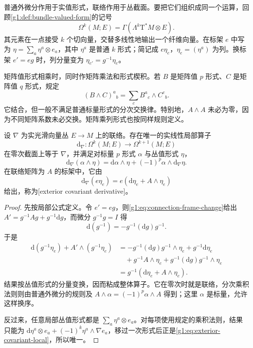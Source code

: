 普通外微分作用于实值形式，联络作用于丛截面。要把它们组织成同一个运算，回顾\cref{g1:def:bundle-valued-form}的记号
\[
	\Omega^k(M;E)=\Gamma(\Lambda^k\mathrm{T}^*M\otimes E).
\]
其元素在一点接受 \(k\) 个切向量，交替多线性地输出一个纤维向量。在标架 \(e\) 中写为 \(\eta=\sum_a\eta^a\otimes e_a\)，其中 \(\eta^a\) 是普通 \(k\) 形式；简记成 \(e\eta_e\)，\(\eta_e=(\eta^a)\) 为列。换标架 \(e'=eg\) 时，列分量变为 \(\eta_{e'}=g^{-1}\eta_e\)。

\ProseParagraphBreak

矩阵值形式相乘时，同时作矩阵乘法和形式楔积。若 \(B\) 是矩阵值 \(p\) 形式、\(C\) 是矩阵值 \(q\) 形式，规定
\[
	(B\wedge C)^a{}_b=\sum_c B^a{}_c\wedge C^c{}_b.
\]
它结合，但一般不满足普通标量形式的分次交换律。特别地，\(A\wedge A\) 未必为零，因为不同矩阵系数未必交换。矩阵乘列形式也按同样规则定义。

\begin{proposition}\label{g1:prop:exterior-covariant-derivative}
	设 \(\nabla\) 为实光滑向量丛 \(E\to M\) 上的联络。存在唯一的实线性局部算子
	\[
		\mathrm{d}_\nabla:\Omega^k(M;E)\longrightarrow\Omega^{k+1}(M;E)
	\]
	在零次截面上等于 \(\nabla\)，并满足对标量 \(p\) 形式 \(\alpha\) 与丛值形式 \(\eta\)，
	\[
		\mathrm{d}_\nabla(\alpha\wedge\eta)
		=\mathrm{d}\alpha\wedge\eta+(-1)^p\alpha\wedge\mathrm{d}_\nabla\eta.
	\]
	在联络矩阵为 \(A\) 的标架中，它由
	\begin{equation}\label{g1:eq:exterior-covariant-local}
		\mathrm{d}_\nabla(e\eta_e)=e(\mathrm{d}\eta_e+A\wedge\eta_e)
	\end{equation}
	给出，称为[exterior covariant derivative]。
\end{proposition}
\begin{proof}
	先按局部公式定义。令 \(e'=eg\)，则\eqref{g1:eq:connection-frame-change}给出 \(A'=g^{-1}Ag+g^{-1}\mathrm{d}g\)，而微分 \(g^{-1}g=I\) 得
	\[
		\mathrm{d}(g^{-1})=-g^{-1}(\mathrm{d}g)g^{-1}.
	\]
	于是
	\begin{align*}
		\mathrm{d}(g^{-1}\eta_e)+A'\wedge(g^{-1}\eta_e)
		&=-g^{-1}(\mathrm{d}g)g^{-1}\wedge\eta_e+g^{-1}\mathrm{d}\eta_e\\
		&\quad+g^{-1}A\wedge\eta_e+g^{-1}(\mathrm{d}g)g^{-1}\wedge\eta_e\\
		&=g^{-1}(\mathrm{d}\eta_e+A\wedge\eta_e).
	\end{align*}
	结果按丛值形式的分量变换，因而粘成整体算子。它在零次时就是联络，分次乘积法则则由普通外微分的规则及 \(A\wedge\alpha=(-1)^p\alpha\wedge A\) 得到；这里 \(\alpha\) 是标量，允许这样换序。

	反过来，任意局部丛值形式都是 \(\sum_a\eta^a\otimes e_a\)。对每项使用规定的乘积法则，结果只能为 \(\mathrm{d}\eta^a\otimes e_a+(-1)^k\eta^a\wedge\nabla e_a\)，移过一次形式后正是\eqref{g1:eq:exterior-covariant-local}，所以唯一。
\end{proof}

